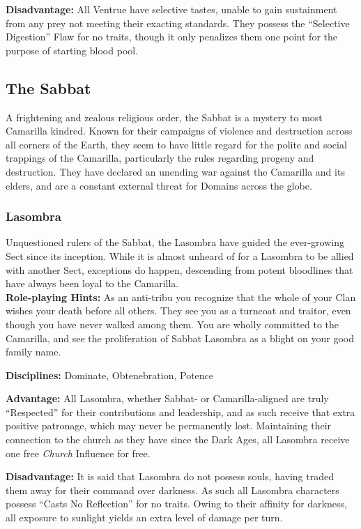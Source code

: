 \textbf{Disadvantage:}  All Ventrue have selective tastes, unable to gain 
sustainment from any prey not meeting their exacting standards.  They possess 
the ``Selective Digestion'' Flaw for no traits, though it only penalizes them 
one point for the purpose of starting blood pool.

\subsection{The Sabbat}
A frightening and zealous religious order, the Sabbat is a mystery to most 
Camarilla kindred.  Known for their campaigns of violence and destruction 
across all corners of the Earth, they seem to have little regard for the 
polite and social trappings of the Camarilla, particularly the rules regarding 
progeny and destruction.  They have declared an unending war against the 
Camarilla and its elders, and are a constant external threat for Domains 
across the globe.

\subsubsection{Lasombra}
Unquestioned rulers of the Sabbat, the Lasombra have guided the ever-growing 
Sect since its inception.  While it is almost unheard of for a Lasombra to 
be allied with another Sect, exceptions do happen, descending from potent 
bloodlines that have always been loyal to the Camarilla. \\

\textbf{Role-playing Hints:}  As an anti-tribu you recognize that the whole 
of your Clan wishes your death before all others.  They see you as a turncoat 
and traitor, even though you have never walked among them.  You are wholly 
committed to the Camarilla, and see the proliferation of Sabbat Lasombra as 
a blight on your good family name.

\textbf{Disciplines:}  Dominate, Obtenebration, Potence

\textbf{Advantage:}  All Lasombra, whether Sabbat- or Camarilla-aligned are 
truly ``Respected'' for their contributions and leadership, and as such receive 
that extra positive patronage, which may never be permanently lost.  
Maintaining their connection to the church as they have since the Dark Ages, 
all Lasombra receive one free \emph{Church} Influence for free.

\textbf{Disadvantage:}  It is said that Lasombra do not possess souls, having 
traded them away for their command over darkness.  As such all Lasombra 
characters possess ``Casts No Reflection'' for no traits.  Owing to their 
affinity for darkness, all exposure to sunlight yields an extra level of 
damage per turn.

